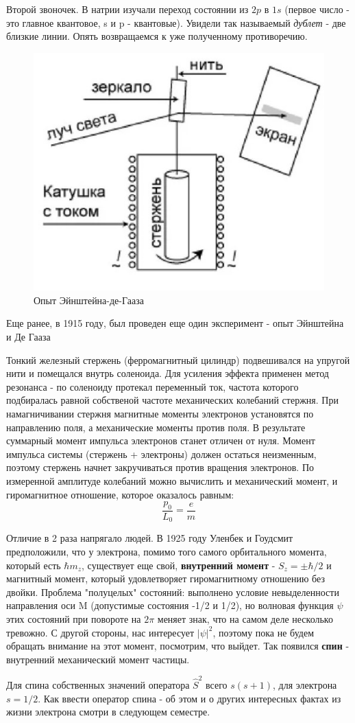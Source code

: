 \par Второй звоночек. В натрии изучали переход состоянии из $2p$ в $1s$ (первое число - это главное квантовое, s и p - квантовые). Увидели так называемый \textit{дублет} - две близкие линии. Опять возвращаемся к уже полученному противоречию. 
\par \begin{figure} 
\vspace{-2ex}
\centering
\includegraphics[width=0.7\linewidth]{pictures/31.2.jpg}
\caption{Опыт Эйнштейна-де-Гааза}
\end{figure}
\par Еще ранее, в 1915 году, был проведен еще один эксперимент - опыт Эйнштейна и Де Гааза

\par Тонкий железный стержень (ферромагнитный цилиндр) подвешивался на упругой нити и помещался внутрь соленоида. Для усиления эффекта применен метод резонанса - по соленоиду протекал переменный ток, частота которого подбиралась равной собственой частоте механических колебаний стержня. При намагничивании стержня магнитные моменты электронов установятся по направлению поля, а механические моменты против поля. В результате суммарный момент импульса электронов станет отличен от нуля. Момент импульса системы (стержень + электроны) должен остаться неизменным, поэтому стержень начнет закручиваться против вращения электронов. По измеренной амплитуде колебаний можно вычислить и механический момент, и гиромагнитное отношение, которое оказалось равным:
$$\frac{p_0}{L_0} = \frac{e}{m}$$
\par Отличие в 2 раза напрягало людей. В 1925 году Уленбек и Гоудсмит предположили, что у электрона, помимо того самого орбитального момента, который есть $\hbar m_z$, существует еще свой, \textbf{внутренний момент} - $S_z= \pm \hbar / 2$ и магнитный момент, который удовлетворяет гиромагнитному отношению без двойки. Проблема "полуцелых" состояний: выполнено условие невыделенности направления оси M (допустимые состояния -1/2 и 1/2), но волновая функция  $\psi$ этих состояний при повороте на $2\pi$ меняет знак, что на самом деле несколько тревожно. С другой стороны, нас интересует $|\psi|^2$, поэтому пока не будем обращать внимание на этот момент, посмотрим, что выйдет. Так появился \textbf{спин} - внутренний механический момент частицы.
\par Для спина собственных значений оператора $\hat{S}^2$ всего $s(s+1)$, для электрона $s=1/2$. Как ввести оператор спина - об этом и о других интересных фактах из жизни электрона смотри в следующем семестре.